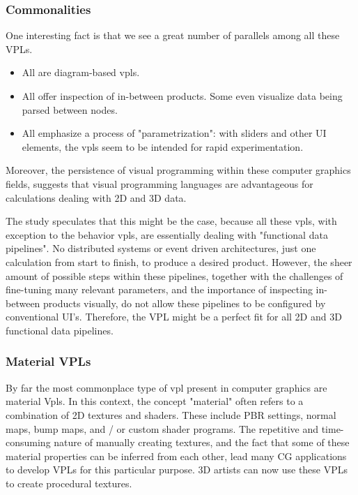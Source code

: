 \subsubsection*{Commonalities}
One interesting fact is that we see a great number of parallels among all these \ac{VPL}s.
\begin{itemize}[-]
  \item All are diagram-based vpls.
  \item All offer inspection of in-between products. Some even visualize data being parsed between nodes.
  \item All emphasize a process of "parametrization": with sliders and other UI elements, the vpls seem to be intended for rapid experimentation.
\end{itemize}
Moreover, the persistence of visual programming within these computer graphics fields, suggests that visual programming languages are advantageous for calculations dealing with 2D and 3D data.

The study speculates that this might be the case, because all these vpls, with exception to the behavior vpls, are essentially dealing with "functional data pipelines".
No distributed systems or event driven architectures, just one calculation from start to finish, to produce a desired product.  
However, the sheer amount of possible steps within these pipelines, together with the challenges of fine-tuning many relevant parameters, and the importance of inspecting in-between products visually, do not allow these pipelines to be configured by conventional UI's. 
Therefore, the \ac{VPL} might be a perfect fit for all 2D and 3D functional data pipelines.

\subsubsection*{Material VPLs}
By far the most commonplace type of vpl present in computer graphics are material Vpls. 
In this context, the concept "material" often refers to a combination of 2D textures and shaders. 
These include PBR settings, normal maps, bump maps, and / or custom shader programs. 
The repetitive and time-consuming nature of manually creating textures, and the fact that some of these material properties can be inferred from each other, lead many CG applications to develop \ac{VPL}s for this particular purpose. 
3D artists can now use these \ac{VPL}s to create procedural textures.

